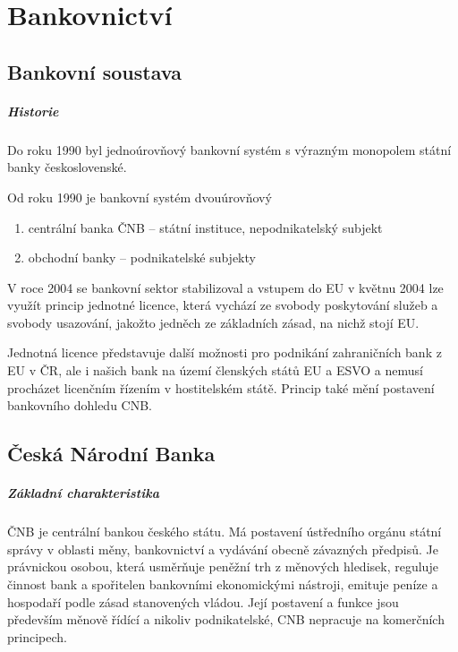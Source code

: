 \chapter{Bankovnictví}

\section*{Bankovní soustava}

\paragraph{Historie}
Do roku 1990 byl jednoúrovňový bankovní systém s výrazným monopolem státní banky československé.

Od roku 1990 je bankovní systém dvouúrovňový
\begin{enumerate}
    \item centrální banka ČNB -- státní instituce, nepodnikatelský subjekt
    \item obchodní banky -- podnikatelské subjekty
\end{enumerate}

V roce 2004 se bankovní sektor stabilizoval a vstupem do EU v květnu 2004 lze využít princip jednotné licence, která vychází ze svobody poskytování služeb a svobody usazování, jakožto jedněch ze základních zásad, na nichž stojí EU.

Jednotná licence představuje další možnosti pro podnikání zahraničních bank z EU v ČR, ale i našich bank na území členských států EU a ESVO a nemusí procházet licenčním řízením v hostitelském státě. Princip také mění postavení bankovního dohledu CNB.

\section*{Česká Národní Banka}

\paragraph{Základní charakteristika}
ČNB je centrální bankou českého státu. Má postavení ústředního orgánu státní správy v oblasti měny, bankovnictví a vydávání obecně závazných předpisů. Je právnickou osobou, která usměrňuje peněžní trh z měnových hledisek, reguluje činnost bank a spořitelen bankovními ekonomickými nástroji, emituje peníze a hospodaří podle zásad stanovených vládou. Její postavení a funkce jsou především měnově řídící a nikoliv podnikatelské, CNB nepracuje na komerčních principech.

